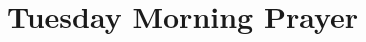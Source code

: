 \documentclass[12pt,twocolumn]{book}
\begin{document}






\section{Tuesday Morning Prayer}





\end{document}
